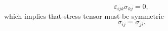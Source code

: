 \documentclass[12pt, letter]{report}
\begin{document}
\begin{equation}
\varepsilon_{ijk} \sigma_{kj} = 0,
\end{equation}
which implies that stress tensor must be symmetric
\begin{equation}
\sigma_{ij} = \sigma_{ji}.
\end{equation}


\end{document}
